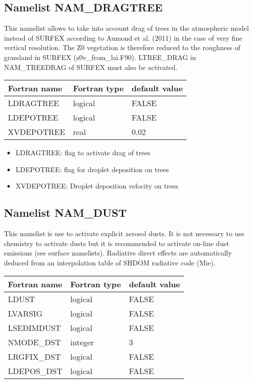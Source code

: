 \subsection{Namelist NAM\_DRAGTREE}
This namelist allows to take into account drag of trees in the atmospheric model instead of SURFEX according
to Aumond et al. (2011) in the case of very fine vertical resolution. 
The Z0 vegetation is therefore reduced to the roughness of grassland in SURFEX
 (z0v\_from\_lai.F90). LTREE\_DRAG in NAM\_TREEDRAG of SURFEX must also be activated.

\begin{center}
\begin{tabular} {|l|l|l|}
\hline
Fortran name & Fortran type & default value \\
\hline
LDRAGTREE   & logical  & FALSE  \\
LDEPOTREE   & logical  & FALSE  \\
XVDEPOTREE   & real  & 0.02  \\
\hline
\end{tabular}
\end{center}

\begin{itemize}

\item LDRAGTREE: flag to activate drag of trees
\item LDEPOTREE: flag for droplet deposition on trees
\item XVDEPOTREE: Droplet deposition velocity on trees
\end{itemize}
\subsection{Namelist NAM\_DUST }
This namelist is use to activate explicit aerosol dusts. 
It is not necessary to use chemistry to activate dusts but it is recommended to activate on-line dust emissions (see surface namelists).
Radiative direct effects are automatically deduced from an interpolation table of SHDOM radiative code (Mie). 

\begin{center}
\begin{tabular} {|l|l|l|}
\hline
Fortran name & Fortran type & default value \\
\hline
LDUST       & logical  & FALSE  \\
LVARSIG     & logical  & FALSE  \\
LSEDIMDUST  & logical  & FALSE  \\
NMODE\_DST & integer  &  3  \\
LRGFIX\_DST  & logical  & FALSE  \\
LDEPOS\_DST  & logical  & FALSE  \\
\hline
\end{tabular}
\end{center}


